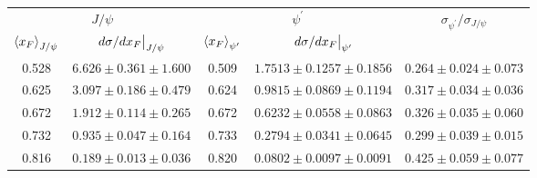 \begin{tabular}{cc|cc|c}
\hline
\multicolumn{2}{c|}{$J/\psi$}                               & \multicolumn{2}{c|}{$\psi^{\prime}$}                                                    & \multirow{2}{*}{$\sigma_{\psi^\prime}/\sigma_{J/\psi}$} \\ \cline{1-4}
$\expval{x_F}_{J/\psi}$    & $\eval{d\sigma/dx_F}_{J/\psi}$ & $\expval{x_F}_{\psi^\prime}$ & $\eval{d\sigma/dx_F}_{\psi^\prime}$ &                                                         \\ \hline
\multicolumn{1}{c|}{0.528} & $6.626\pm0.361\pm1.600$        & \multicolumn{1}{c|}{0.509}                        & $1.7513\pm0.1257\pm0.1856$          & $0.264\pm0.024\pm0.073$                                 \\
\multicolumn{1}{c|}{0.625} & $3.097\pm0.186\pm0.479$        & \multicolumn{1}{c|}{0.624}                        & $0.9815\pm0.0869\pm0.1194$          & $0.317\pm0.034\pm0.036$                                 \\
\multicolumn{1}{c|}{0.672} & $1.912\pm0.114\pm0.265$        & \multicolumn{1}{c|}{0.672}                        & $0.6232\pm0.0558\pm0.0863$          & $0.326\pm0.035\pm0.060$                                 \\
\multicolumn{1}{c|}{0.732} & $0.935\pm0.047\pm0.164$        & \multicolumn{1}{c|}{0.733}                        & $0.2794\pm0.0341\pm0.0645$          & $0.299\pm0.039\pm0.015$                                 \\
\multicolumn{1}{c|}{0.816} & $0.189\pm0.013\pm0.036$        & \multicolumn{1}{c|}{0.820}                        & $0.0802\pm0.0097\pm0.0091$          & $0.425\pm0.059\pm0.077$                                 \\ \hline
\end{tabular}
